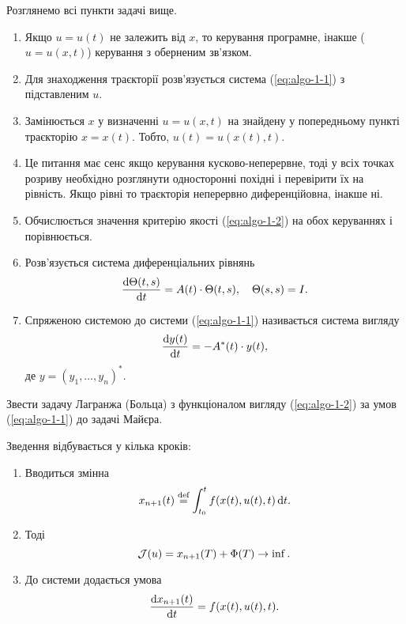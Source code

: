 \begin{algorithm}
	Розглянемо всі пункти задачі вище.
	\begin{enumerate}
		\item Якщо $u = u(t)$ не залежить від $x$, то керування програмне, інакше ($u = u(x, t)$) керування з оберненим зв'язком.
		\item Для знаходження траєкторії %
		розв'язується система (\ref{eq:algo-1-1}) з підставленим $u$.
		\item Замінюється $x$ у визначенні $u = u(x, t)$ на знайдену у попередньому пункті траєкторію $x = x(t)$. Тобто, $u(t) = u(x(t), t)$.
		\item Це питання має сенс якщо керування кусково-неперервне, тоді у всіх точках розриву %
		необхідно розглянути односторонні похідні і перевірити їх на рівність. Якщо рівні то траєкторія неперервно диференційовна, інакше ні.
		\item Обчислюється значення критерію якості (\ref{eq:algo-1-2}) на обох керуваннях і порівнюється.
		\item Розв'язується система диференціальних рівнянь 
		\begin{equation}
		    \label{eq:algo-1-3}
		    \frac{\mathop{}\!\mathrm{d} \Theta(t, s)}{\mathop{}\!\mathrm{d} t} = A(t) \cdot \Theta(t, s), \quad \Theta(s, s) = I.
		\end{equation}
		\item Спряженою системою до системи (\ref{eq:algo-1-1}) називається система вигляду
		\begin{equation}
		    \label{eq:algo-1-4}
		    \frac{\mathop{}\!\mathrm{d} y(t)}{\mathop{}\!\mathrm{d} t} = - A^*(t) \cdot y(t),
		\end{equation}
		де $y = (y_1, \ldots, y_n)^*$.
	\end{enumerate}
\end{algorithm}

\begin{problem*}
	Звести задачу Лагранжа (Больца) з функціоналом вигляду (\ref{eq:algo-1-2}) за умов (\ref{eq:algo-1-1}) до задачі Майєра.
\end{problem*}

\begin{algorithm}
    \label{algo-1-2}
    Зведення відбувається у кілька кроків:
	\begin{enumerate}
		\item Вводиться змінна \[x_{n+1} (t) \overset{\text{def}}{=} \int_{t_0}^t f(x(t), u(t), t) \mathop{}\!\mathrm{d} t.\]
		\item Тоді \[ \mathcal{J}(u) = x_{n+1} (T) + \Phi(T) \to \inf. \]
		\item До системи додається умова \[ \frac{\mathop{}\!\mathrm{d} x_{n+1}(t)}{\mathop{}\!\mathrm{d} t} = f(x(t), u(t), t). \]
	\end{enumerate}
\end{algorithm}
